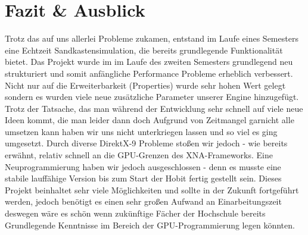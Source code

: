 \chapter{Fazit \& Ausblick}

\begin{Spacing}{\mylinespace}
Trotz das auf uns allerlei Probleme zukamen, entstand im Laufe eines Semesters eine Echtzeit Sandkastensimulation, die bereits grundlegende Funktionalität bietet. 
Das Projekt wurde im  im Laufe des zweiten Semesters grundlegend neu strukturiert und somit anfängliche Performance Probleme erheblich verbessert.
Nicht nur auf die Erweiterbarkeit (Properties) wurde sehr hohen Wert gelegt sondern es wurden viele neue zusätzliche Parameter unserer Engine hinzugefügt.
Trotz der Tatsache, das man während der Entwicklung sehr schnell auf viele neue Ideen kommt, die man leider dann doch Aufgrund von Zeitmangel garnicht alle umsetzen kann haben wir uns nicht unterkriegen lassen und so viel es ging umgesetzt. Durch diverse DirektX-9 Probleme stoßen wir jedoch - wie bereits erwähnt, relativ schnell an die GPU-Grenzen des XNA-Frameworks.
Eine Neuprogrammierung haben wir jedoch ausgeschlossen - denn es musste eine stabile lauffähige Version bis zum Start der Hobit fertig gestellt sein.
Dieses Projekt beinhaltet sehr viele Möglichkeiten und sollte in der Zukunft fortgeführt werden, jedoch benötigt es einen sehr großen Aufwand an Einarbeitungszeit deswegen wäre es schön wenn zukünftige Fächer der Hochschule bereits Grundlegende Kenntnisse im Bereich der GPU-Programmierung legen könnten.
	
\end{Spacing}
\newpage
\clearpage
